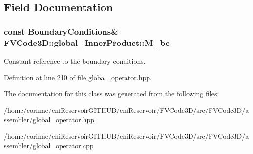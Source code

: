 \subsection{Field Documentation}
\subsubsection[{\texorpdfstring{M\+\_\+bc}{M_bc}}]{\setlength{\rightskip}{0pt plus 5cm}const {\bf Boundary\+Conditions}\& F\+V\+Code3\+D\+::global\+\_\+\+Inner\+Product\+::\+M\+\_\+bc\hspace{0.3cm}{\ttfamily [private]}}\hypertarget{classFVCode3D_1_1global__InnerProduct_a62bbb87bc4710a73980603b8b77ffda8}{}\label{classFVCode3D_1_1global__InnerProduct_a62bbb87bc4710a73980603b8b77ffda8}


Constant reference to the boundary conditions. 



Definition at line \hyperlink{global__operator_8hpp_source_l00210}{210} of file \hyperlink{global__operator_8hpp_source}{global\+\_\+operator.\+hpp}.



The documentation for this class was generated from the following files\+:\begin{DoxyCompactItemize}
\item 
/home/corinne/eni\+Reservoir\+G\+I\+T\+H\+U\+B/eni\+Reservoir/\+F\+V\+Code3\+D/src/\+F\+V\+Code3\+D/assembler/\hyperlink{global__operator_8hpp}{global\+\_\+operator.\+hpp}\item 
/home/corinne/eni\+Reservoir\+G\+I\+T\+H\+U\+B/eni\+Reservoir/\+F\+V\+Code3\+D/src/\+F\+V\+Code3\+D/assembler/\hyperlink{global__operator_8cpp}{global\+\_\+operator.\+cpp}\end{DoxyCompactItemize}
